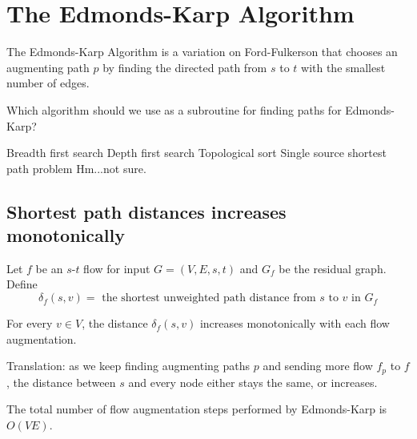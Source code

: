 \documentclass[11  pt]{article}
\begin{document}
\newpage

\section{The Edmonds-Karp Algorithm}

The Edmonds-Karp Algorithm is a variation on Ford-Fulkerson that chooses an augmenting path $p$ by finding the directed path from $s$ to $t$ with the smallest number of edges.

\begin{Qu}
	Which algorithm should we use as a subroutine for finding paths for Edmonds-Karp?
	\begin{itemize}
		\aitem Breadth first search
		\bitem Depth first search
		\citem Topological sort
		\ditem Single source shortest path problem
		\eitem Hm...not sure.
	\end{itemize}
\end{Qu}

\subsection{Shortest path distances increases monotonically}

Let $f$ be an $s$-$t$ flow for input $G = (V,E,s,t)$ and $G_f$ be the residual graph. Define\\

\begin{equation*}
	\delta_f(s,v) = \text{ the shortest unweighted path distance from $s$ to $v$ in $G_f$}
\end{equation*}

\begin{lemma}
	For every $v \in V$, the distance $\delta_f(s,v)$ increases monotonically with each flow augmentation.\\
\end{lemma}

Translation: as we keep finding augmenting paths $p$ and sending more flow $f_p$ to $f$, the distance between $s$ and every node either stays the same, or increases. \\


\newpage

\begin{theorem}
	The total number of flow augmentation steps performed by Edmonds-Karp is $O(VE)$.
\end{theorem}
\end{document}
